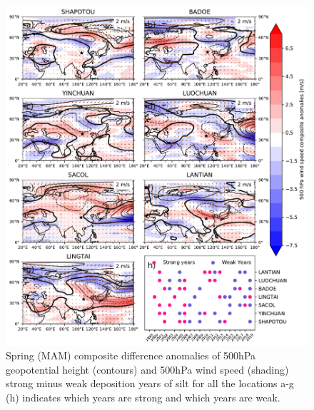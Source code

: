 \begin{figure}[hptb]
    \centering
    \includegraphics[width=\columnwidth]{texfiles/figs/geopot_ws_500hPa_20micron_MAM.pdf}
    \caption{Spring (MAM) composite difference anomalies of 500hPa geopotential height (contours) and 500hPa wind speed (shading) strong minus weak deposition years of silt for all the locations a-g  (h) indicates which years are strong and which years are weak.}
    \label{fig:MAM_500hPa_coarse_composite}
\end{figure}
